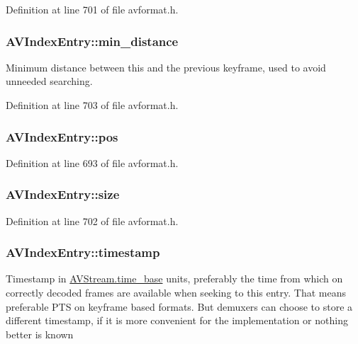Definition at line 701 of file avformat.\+h.

\subsubsection[{\texorpdfstring{min\+\_\+distance}{min_distance}}]{ A\+V\+Index\+Entry\+::min\+\_\+distance}\hypertarget{struct_a_v_index_entry_add3fa33e8b3363a96fa4c62fca1bcf42}{}\label{struct_a_v_index_entry_add3fa33e8b3363a96fa4c62fca1bcf42}
Minimum distance between this and the previous keyframe, used to avoid unneeded searching. 

Definition at line 703 of file avformat.\+h.

\subsubsection[{\texorpdfstring{pos}{pos}}]{ A\+V\+Index\+Entry\+::pos}\hypertarget{struct_a_v_index_entry_ac0dd805ffd04bb52b1a358331dd10b98}{}\label{struct_a_v_index_entry_ac0dd805ffd04bb52b1a358331dd10b98}


Definition at line 693 of file avformat.\+h.

\subsubsection[{\texorpdfstring{size}{size}}]{ A\+V\+Index\+Entry\+::size}\hypertarget{struct_a_v_index_entry_a1b57d93b863a1b605461229a65ca8b52}{}\label{struct_a_v_index_entry_a1b57d93b863a1b605461229a65ca8b52}


Definition at line 702 of file avformat.\+h.

\subsubsection[{\texorpdfstring{timestamp}{timestamp}}]{ A\+V\+Index\+Entry\+::timestamp}\hypertarget{struct_a_v_index_entry_affef8bf4cd2f53a47ebc2d298d0d57c1}{}\label{struct_a_v_index_entry_affef8bf4cd2f53a47ebc2d298d0d57c1}
Timestamp in \hyperlink{struct_a_v_stream_a9db755451f14e2bf590d4b85d82b32e6}{A\+V\+Stream.\+time\+\_\+base} units, preferably the time from which on correctly decoded frames are available when seeking to this entry. That means preferable P\+TS on keyframe based formats. But demuxers can choose to store a different timestamp, if it is more convenient for the implementation or nothing better is known 


